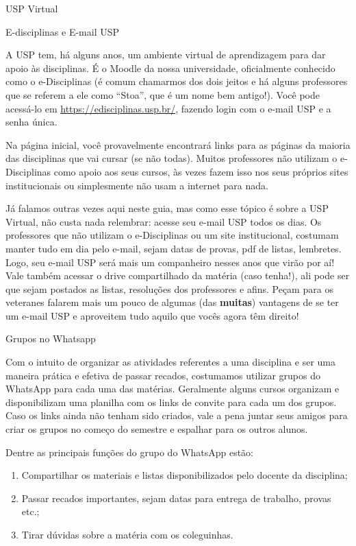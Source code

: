 \begin{secao}{USP Virtual}

\begin{subsecao}{E-disciplinas e E-mail USP}

A USP tem, há alguns anos, um ambiente virtual de aprendizagem para dar apoio
às disciplinas. É o Moodle da nossa universidade, oficialmente conhecido como
o e-Disciplinas (é comum chamarmos dos dois jeitos e há alguns professores que
se referem a ele como ``Stoa'', que é um nome bem antigo!). Você pode acessá-lo em
\url{https://edisciplinas.usp.br/}, fazendo login com o e-mail USP e a senha única.

Na página inicial, você provavelmente encontrará links para as páginas da maioria
das disciplinas que vai cursar (se não todas). Muitos professores não utilizam o 
e-Disciplinas como apoio aos seus cursos, às vezes fazem isso nos seus próprios 
sites institucionais ou simplesmente não usam a internet para nada. 

Já falamos outras vezes aqui neste guia, mas como esse tópico é sobre a USP Virtual,
não custa nada relembrar: acesse seu e-mail USP todos os dias. Os professores que não 
utilizam o e-Disciplinas ou um site institucional, costumam manter tudo em dia pelo 
e-mail, sejam datas de provas, pdf de listas, lembretes. Logo, seu e-mail USP será mais 
um companheiro nesses anos que virão por aí! Vale também acessar o drive compartilhado 
da matéria (caso tenha!), ali pode ser que sejam postados as listas, resoluções dos 
professores e afins. Peçam para os veteranes falarem mais um pouco de algumas 
(das \textbf{muitas}) vantagens de se ter um e-mail USP e aproveitem tudo aquilo que 
vocês agora têm direito!

\end{subsecao}

\begin{subsecao}{Grupos no Whatsapp}

Com o intuito de organizar as atividades referentes a uma disciplina e ser uma
maneira prática e efetiva de passar recados, costumamos utilizar grupos do WhatsApp
para cada uma das matérias. Geralmente alguns cursos organizam e disponibilizam uma planilha 
com os links de convite para cada um dos grupos. Caso os links ainda não tenham sido criados,
vale a pena juntar seus amigos para criar os grupos no começo do semestre e espalhar
para os outros alunos.

Dentre as principais funções do grupo do WhatsApp estão:

\begin{enumerate}
\item Compartilhar os materiais e listas disponibilizados pelo docente da disciplina;
\item Passar recados importantes, sejam datas para entrega de trabalho, provas etc.;
\item Tirar dúvidas sobre a matéria com os coleguinhas.
\end{enumerate}


\end{subsecao}
\end{secao}
